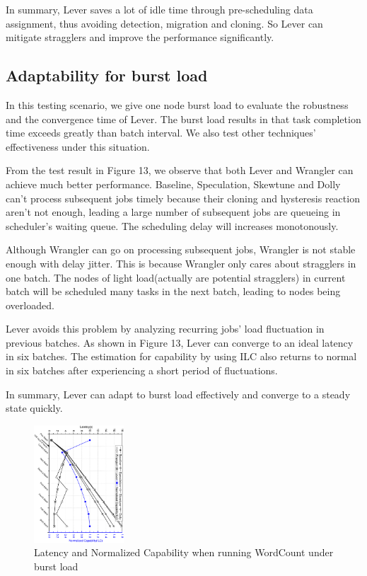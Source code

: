 \documentclass[10pt,conference,compsocconf,letterpaper]{IEEEtran}
\begin{document}
  In summary, Lever saves a lot of idle time through pre-scheduling data assignment, thus avoiding detection, migration and cloning. So Lever can mitigate stragglers and improve the performance significantly.

\subsection{Adaptability for burst load}

  In this testing scenario, we give one node burst load to evaluate the robustness and the convergence time of Lever. The burst load results in that task completion time exceeds greatly than batch interval. We also test other techniques' effectiveness under this situation.

  From the test result in Figure 13, we observe that both Lever and Wrangler can achieve much better performance. Baseline, Speculation, Skewtune and Dolly can't process subsequent jobs timely because their cloning and hysteresis reaction aren't not enough, leading a large number of subsequent jobs are queueing in scheduler's waiting queue. The scheduling delay will increases monotonously.

  Although Wrangler can go on processing subsequent jobs, Wrangler is not stable enough with delay jitter. This is because Wrangler only cares about stragglers in one batch. The nodes of light load(actually are potential stragglers) in current batch will be scheduled many tasks in the next batch, leading to nodes being overloaded.

  Lever avoids this problem by analyzing recurring jobs' load fluctuation in previous batches. As shown in Figure 13, Lever can converge to an ideal latency in six batches. The estimation for capability by using ILC also returns to normal in six batches after experiencing a short period of fluctuations.

  In summary, Lever can adapt to burst load effectively and converge to a steady state quickly.
  \begin{figure}[htbp]
    \centering
    \includegraphics[width=0.30\textwidth, angle=90]{FigureAdapBurst}
    \caption{Latency and Normalized Capability when running WordCount under burst load}
    \label{Fig. 13:}
  \end{figure}
\end{document}
